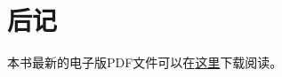 \chapter*{后记}

本书最新的电子版PDF文件可以在\href{https://github.com/mike2718/ham/archive/refs/heads/main.zip}{这里}下载阅读。%